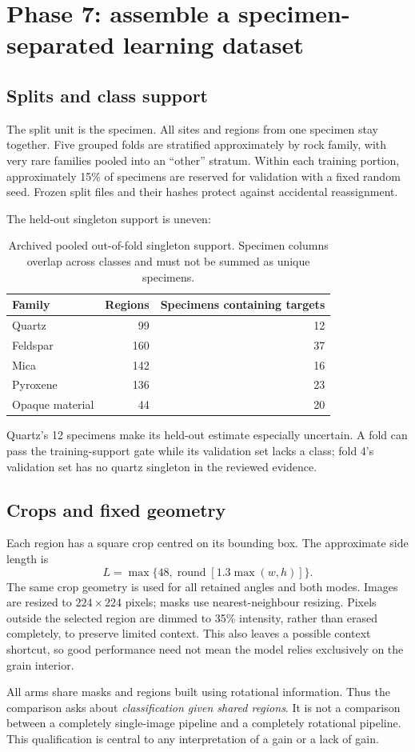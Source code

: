 \section{Phase 7: assemble a specimen-separated learning dataset}
\subsection{Splits and class support}
The split unit is the specimen. All sites and regions from one specimen stay together. Five grouped folds are stratified approximately by rock family, with very rare families pooled into an ``other'' stratum. Within each training portion, approximately 15\% of specimens are reserved for validation with a fixed random seed. Frozen split files and their hashes protect against accidental reassignment.

The held-out singleton support is uneven:
\begin{table}[htbp]\centering
\begin{tabular}{@{}lrr@{}}\toprule Family & Regions & Specimens containing targets\\\midrule
Quartz & 99 & 12\\
Feldspar & 160 & 37\\
Mica & 142 & 16\\
Pyroxene & 136 & 23\\
Opaque material & 44 & 20\\\bottomrule
\end{tabular}
\caption{Archived pooled out-of-fold singleton support. Specimen columns overlap across classes and must not be summed as unique specimens.}
\end{table}
Quartz's 12 specimens make its held-out estimate especially uncertain. A fold can pass the training-support gate while its validation set lacks a class; fold 4's validation set has no quartz singleton in the reviewed evidence.

\subsection{Crops and fixed geometry}
Each region has a square crop centred on its bounding box. The approximate side length is
\begin{equation}
L=\max\{48,\operatorname{round}[1.3\max(w,h)]\}.
\end{equation}
The same crop geometry is used for all retained angles and both modes. Images are resized to $224\times224$ pixels; masks use nearest-neighbour resizing. Pixels outside the selected region are dimmed to 35\% intensity, rather than erased completely, to preserve limited context. This also leaves a possible context shortcut, so good performance need not mean the model relies exclusively on the grain interior.

All arms share masks and regions built using rotational information. Thus the comparison asks about \emph{classification given shared regions}. It is not a comparison between a completely single-image pipeline and a completely rotational pipeline. This qualification is central to any interpretation of a gain or a lack of gain.
\FloatBarrier
